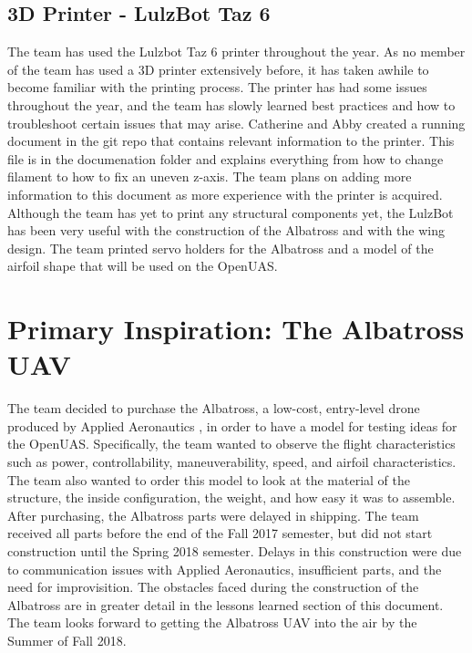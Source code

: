 ﻿\documentclass{article}
\begin{document}
\subsection{3D Printer - LulzBot Taz 6}
\noindent The team has used the Lulzbot Taz 6 printer throughout the year. As no member of the team has used a 3D printer extensively before, it has taken awhile to become familiar with the printing process. The printer has had some issues throughout the year, and the team has slowly learned best practices and how to troubleshoot certain issues that may arise. Catherine and Abby created a running document in the git repo that contains relevant information to the printer. This file is in the documenation folder and explains everything from how to change filament to how to fix an uneven z-axis. The team plans on adding more information to this document as more experience with the printer is acquired. \\
\noindent Although the team has yet to print any structural components yet, the LulzBot has been very useful with the construction of the Albatross and with the wing design. The team printed servo holders for the Albatross and a model of the airfoil shape that will be used on the OpenUAS.\\

\section{Primary Inspiration: The Albatross UAV}
\noindent The team decided to purchase the Albatross, a low-cost, entry-level drone produced by Applied Aeronautics \cite{AlbatrossFAQ}, in order to have a model for testing ideas for the OpenUAS. Specifically, the team wanted to observe the flight characteristics such as power, controllability, maneuverability, speed, and airfoil characteristics. The team also wanted to order this model to look at the material of the structure, the inside configuration, the weight, and how easy it was to assemble. \\

\noindent After purchasing, the Albatross parts were delayed in shipping. The team received all parts before the end of the Fall 2017 semester, but did not start construction until the Spring 2018 semester. Delays in this construction were due to communication issues with Applied Aeronautics, insufficient parts, and the need for improvisition. The obstacles faced during the construction of the Albatross are in greater detail in the lessons learned section of this document. The team looks forward to getting the Albatross UAV into the air by the Summer of Fall 2018.\\
\end{document}
